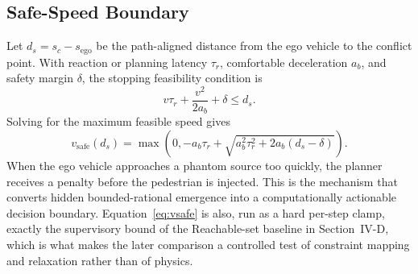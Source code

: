 \documentclass[journal]{IEEEtran}
\begin{document}
\subsection{Safe-Speed Boundary}

Let $d_s = s_c - s_{\mathrm{ego}}$ be the path-aligned distance from the ego vehicle to the conflict point. With reaction or planning latency $\tau_r$, comfortable deceleration $a_b$, and safety margin $\delta$, the stopping feasibility condition is
\begin{equation}
  v\tau_r + \frac{v^2}{2a_b} + \delta \le d_s.
\end{equation}
Solving for the maximum feasible speed gives
\begin{equation}
  v_{\mathrm{safe}}(d_s) =
  \max\!\left(0,
  -a_b\tau_r + \sqrt{a_b^2\tau_r^2 + 2a_b(d_s-\delta)}
  \right).
  \label{eq:vsafe}
\end{equation}
When the ego vehicle approaches a phantom source too quickly, the planner receives a penalty before the pedestrian is injected. This is the mechanism that converts hidden bounded-rational emergence into a computationally actionable decision boundary. Equation~\eqref{eq:vsafe} is also, run as a hard per-step clamp, exactly the supervisory bound of the Reachable-set baseline in Section~IV-D, which is what makes the later comparison a controlled test of constraint mapping and relaxation rather than of physics.
\end{document}
